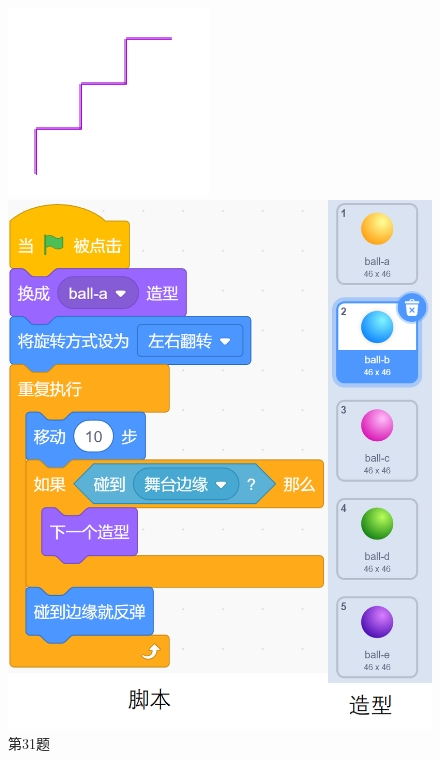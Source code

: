 \documentclass[10pt, a4paper]{article}
\begin{document}
\begin{enumerate}
\begin{figure}[htbp]
\begin{minipage}[t]{.2\textwidth}
\begin{minipage}[t]{.56\textwidth}
                \end{minipage}
                \begin{minipage}[t]{.4\textwidth}
                    \centering
                    \includegraphics[width=\textwidth]{31-2.png}
                \end{minipage}
                \caption*{第31题}
            \end{minipage}
            \begin{minipage}[t]{.2\textwidth}
                \centering
                \includegraphics[width=\textwidth]{32-1.png}

\end{minipage}
\end{figure}
\end{enumerate}
\end{document}
